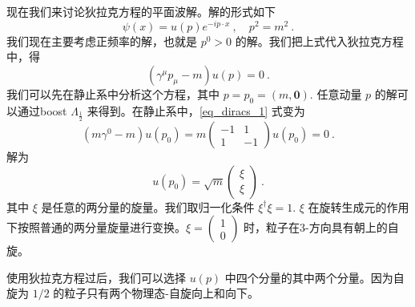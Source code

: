 
现在我们来讨论狄拉克方程的平面波解。解的形式如下
\begin{equation}
\psi(x) = u(p)e^{-ip\cdot x}~, \quad p^2 = m^2~.
\end{equation}
我们现在主要考虑正频率的解，也就是 $p^0>0$ 的解。我们把上式代入狄拉克方程中，得
\begin{equation}\label{eq_diracs_1}
(\gamma^\mu p_\mu - m) u(p) = 0~.
\end{equation}
我们可以先在静止系中分析这个方程，其中 $p=p_0=(m,\boldsymbol 0 )$. 任意动量 $p$ 的解可以通过boost $\Lambda_{\frac{1}{2}}$ 来得到。在静止系中，\autoref{eq_diracs_1} 式变为
\begin{equation}
(m\gamma^0-m)u(p_0) = m\begin{pmatrix}
-1 & 1 \\
 1 & -1
\end{pmatrix}u(p_0) = 0 ~.
\end{equation}
解为
\begin{equation}
u(p_0) = \sqrt{m} \begin{pmatrix}
\xi \\ \xi
\end{pmatrix}~.
\end{equation}
其中 $\xi$ 是任意的两分量的旋量。我们取归一化条件 $\xi^\dagger \xi =1$. $\xi$ 在旋转生成元的作用下按照普通的两分量旋量进行变换。$\xi = \begin{pmatrix}
1 \\0
\end{pmatrix}$ 时，粒子在3-方向具有朝上的自旋。

使用狄拉克方程过后，我们可以选择 $u(p)$ 中四个分量的其中两个分量。因为自旋为 $1/2$ 的粒子只有两个物理态-自旋向上和向下。

